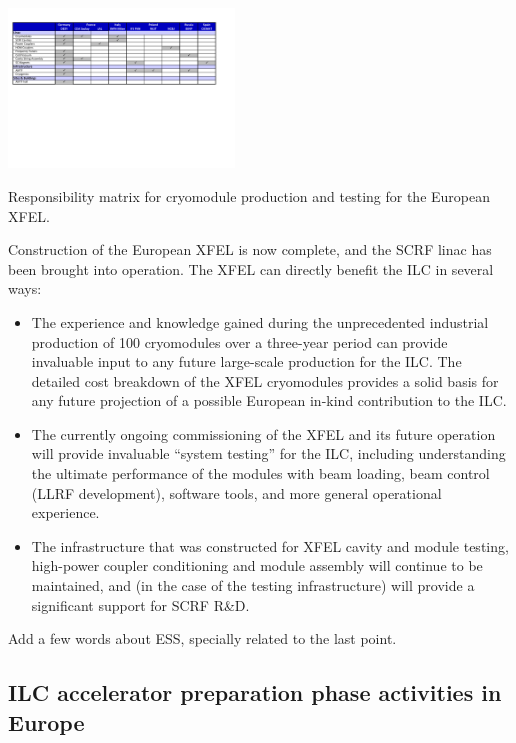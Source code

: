 \documentclass[%
 reprint,
 amsmath,amssymb,
 aps,
]{revtex4-1}
\begin{document}
\begin{table}[htbp]
\includegraphics[width=0.45\textwidth]{figures/ILCEAP-Matrices-XFEL.pdf}
\caption{\label{tab:PrePrep:XFELResponsibilities} Responsibility matrix for cryomodule production and testing for the European XFEL.} 
\end{table}

Construction of the European XFEL is now complete, and the SCRF linac has been brought into operation. The XFEL can directly benefit the ILC in several ways: \\
\begin{itemize}
\item The experience and knowledge gained during the unprecedented industrial
production of 100 cryomodules over a three-year period can provide 
invaluable input to any future large-scale production for the ILC. The detailed cost breakdown of the XFEL cryomodules provides a solid basis for any future projection of a possible European in-kind contribution to the ILC. 
\item 
The currently ongoing commissioning of the XFEL and its future operation will provide invaluable ``system testing'' for the ILC, including understanding the ultimate performance of the modules with beam loading, beam control (LLRF development), software tools, and more general operational experience. 
\item The infrastructure that was constructed for XFEL cavity and module 
testing, high-power coupler conditioning and module assembly will continue to be maintained, and (in the case of the testing infrastructure) will provide a significant support for SCRF R\&D.
\end{itemize}

Add a few words about ESS, specially related to the last point.

\subsection{ILC accelerator preparation phase activities in Europe ~\label{sec:prepphase:accelerator}}
\end{document}
